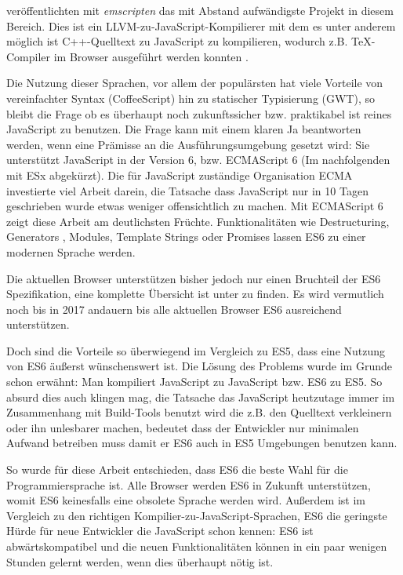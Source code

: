 \documentclass[12pt,twoside]{book}
\begin{document}
\citep{zakai2011emscripten} veröffentlichten mit \textit{emscripten} das mit Abstand aufwändigste Projekt in diesem Bereich. Dies ist ein LLVM-zu-JavaScript-Kompilierer mit dem es unter anderem möglich ist C++-Quelltext zu JavaScript zu kompilieren, wodurch z.B. TeX-Compiler im Browser ausgeführt werden konnten \cite{texlive}.

Die Nutzung dieser Sprachen, vor allem der populärsten hat viele Vorteile von vereinfachter Syntax (CoffeeScript) hin zu statischer Typisierung (GWT), so bleibt die Frage ob es überhaupt noch zukunftssicher bzw. praktikabel ist reines JavaScript zu benutzen.
Die Frage kann mit einem klaren Ja beantworten werden, wenn eine Prämisse an die Ausführungsumgebung gesetzt wird: Sie unterstützt JavaScript in der Version 6, bzw. ECMAScript 6 (Im nachfolgenden mit ESx abgekürzt).
Die für JavaScript zuständige Organisation ECMA investierte viel Arbeit darein, die Tatsache dass JavaScript nur in 10 Tagen geschrieben wurde etwas weniger offensichtlich zu machen. Mit ECMAScript 6 \cite{es6} zeigt diese Arbeit am deutlichsten Früchte. Funktionalitäten wie Destructuring, Generators , Modules, Template Strings oder Promises lassen ES6 zu einer modernen Sprache werden.

Die aktuellen Browser unterstützen bisher jedoch nur einen Bruchteil der ES6 Spezifikation, eine komplette Übersicht ist unter \cite{es6features} zu finden. Es wird vermutlich noch bis in 2017 andauern bis alle aktuellen Browser ES6 ausreichend unterstützen.

Doch sind die Vorteile so überwiegend im Vergleich zu ES5, dass eine Nutzung von ES6 äußerst wünschenswert ist.
Die Lösung des Problems wurde im Grunde schon erwähnt: Man kompiliert JavaScript zu JavaScript bzw. ES6 zu ES5.
So absurd dies auch klingen mag, die Tatsache das JavaScript heutzutage immer im Zusammenhang mit Build-Tools benutzt wird die z.B. den Quelltext verkleinern oder ihn unlesbarer machen, bedeutet dass der Entwickler nur minimalen Aufwand betreiben muss damit er ES6 auch in ES5 Umgebungen benutzen kann.

So wurde für diese Arbeit entschieden, dass ES6 die beste Wahl für die Programmiersprache ist. Alle Browser werden ES6 in Zukunft unterstützen, womit ES6 keinesfalls eine obsolete Sprache werden wird. Außerdem ist im Vergleich zu den richtigen Kompilier-zu-JavaScript-Sprachen, ES6 die geringste Hürde für neue Entwickler die JavaScript schon kennen: ES6 ist abwärtskompatibel und die neuen Funktionalitäten können in ein paar wenigen Stunden gelernt werden, wenn dies überhaupt nötig ist.
\end{document}
